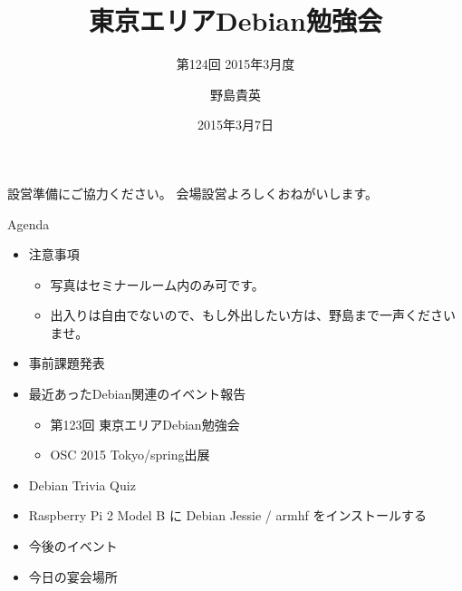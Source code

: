 \title{東京エリアDebian勉強会}
\subtitle{第124回 2015年3月度}
\author{野島貴英}
\date{2015年3月7日}



\begin{frame}
\titlepage{}
\end{frame}

\begin{frame}{設営準備にご協力ください。}
会場設営よろしくおねがいします。
\end{frame}

\begin{frame}{Agenda}
 \begin{minipage}[t]{0.45\hsize}
  \begin{itemize}
   \item 注意事項
	 \begin{itemize}
	  \item 写真はセミナールーム内のみ可です。
          \item 出入りは自由でないので、もし外出したい方は、野島まで一声くださいませ。
	 \end{itemize}
   \item 事前課題発表
  \end{itemize}
 \end{minipage} 
 \begin{minipage}[t]{0.45\hsize}
  \begin{itemize}
   \item 最近あったDebian関連のイベント報告
	 \begin{itemize}
	 \item 第123回 東京エリアDebian勉強会
         \item OSC 2015 Tokyo/spring出展
	 \end{itemize}
   \item Debian Trivia Quiz
   \item Raspberry Pi 2 Model B に Debian Jessie / armhf をインストールする
   \item 今後のイベント
   \item 今日の宴会場所
  \end{itemize}
 \end{minipage}
\end{frame}

